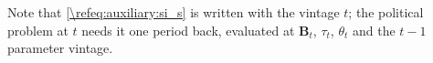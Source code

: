 Note that \eqref{\refeq:auxiliary:si_s} is written with the vintage $t$; the political problem at $t$ needs it one period back, evaluated at $\bm{B}_t$, $\tau_t$, $\theta_t$ and the $t-1$ parameter vintage.







